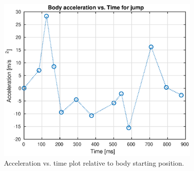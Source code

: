 \begin{figure}
\centering
\includegraphics[width=0.9\textwidth]{images/experiments/jump/acceleration-vs-time.eps} 
\caption{Acceleration vs. time plot relative to body starting position.}
\label{fig:acc-time-jump}
\end{figure}

